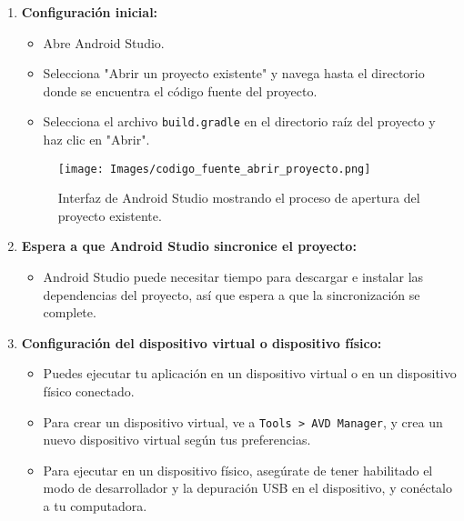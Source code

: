 \documentclass{article}
\begin{document}
    \begin{enumerate}
        \item \textbf{Configuración inicial:}
            \begin{itemize}
                \item Abre Android Studio.
                \item Selecciona "Abrir un proyecto existente" y navega hasta el directorio donde se encuentra el código fuente del proyecto.
                \item Selecciona el archivo \texttt{build.gradle} en el directorio raíz del proyecto y haz clic en "Abrir".
            \end{itemize}
            
            \begin{figure}[h]
                \centering
                \texttt{[image: Images/codigo\_fuente\_abrir\_proyecto.png]}
                \caption{Interfaz de Android Studio mostrando el proceso de apertura del proyecto existente.}
                \label{fig:codigo_fuente}
            \end{figure}
        
        \item \textbf{Espera a que Android Studio sincronice el proyecto:}
            \begin{itemize}
                \item Android Studio puede necesitar tiempo para descargar e instalar las dependencias del proyecto, así que espera a que la sincronización se complete.
            \end{itemize}
            
        \item \textbf{Configuración del dispositivo virtual o dispositivo físico:}
            \begin{itemize}
                \item Puedes ejecutar tu aplicación en un dispositivo virtual o en un dispositivo físico conectado.
                \item Para crear un dispositivo virtual, ve a \texttt{Tools > AVD Manager}, y crea un nuevo dispositivo virtual según tus preferencias.
                \item Para ejecutar en un dispositivo físico, asegúrate de tener habilitado el modo de desarrollador y la depuración USB en el dispositivo, y conéctalo a tu computadora.
            \end{itemize}
        

\end{enumerate}
\end{document}
